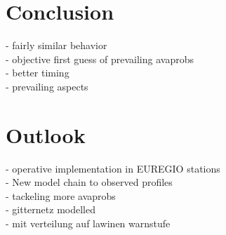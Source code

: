 \chapter{Conclusion}


- fairly similar behavior \\
- objective first guess of prevailing avaprobs\\
- better timing\\
- prevailing aspects


\chapter{Outlook}

- operative implementation in EUREGIO stations\\
- New model chain to observed profiles\\
- tackeling more avaprobs\\
- gitternetz modelled\\
- mit verteilung auf lawinen warnstufe\\


